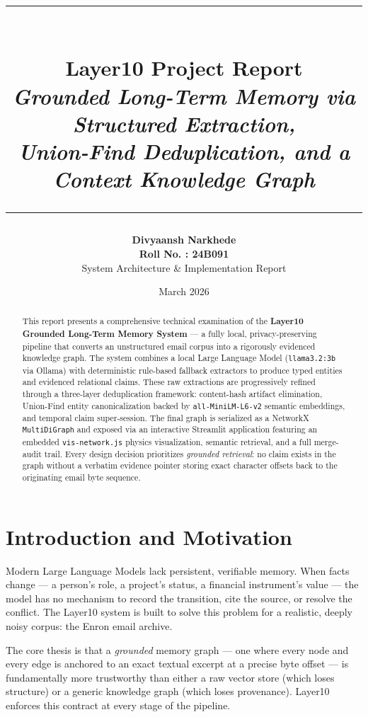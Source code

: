 \documentclass[12pt,a4paper]{article}
\title{
    \vspace{-2cm}
    \rule{\linewidth}{0.8mm} \\[0.5cm]
    {\Huge \textbf{Layer10 Project Report}} \\[0.3cm]
    {\large \textit{Grounded Long-Term Memory via Structured Extraction,\\
    Union-Find Deduplication, and a Context Knowledge Graph}} \\[0.3cm]
    \rule{\linewidth}{0.8mm}
}
\author{
    \textbf{Divyaansh Narkhede} \\
    \textbf{Roll No. : 24B091} \\
    System Architecture \& Implementation Report
}
\date{March 2026}
\begin{document}
\maketitle
\thispagestyle{empty}

\begin{abstract}
\noindent
This report presents a comprehensive technical examination of the \textbf{Layer10 Grounded Long-Term Memory System} — a fully local, privacy-preserving pipeline that converts an unstructured email corpus into a rigorously evidenced knowledge graph. The system combines a local Large Language Model (\texttt{llama3.2:3b} via Ollama) with deterministic rule-based fallback extractors to produce typed entities and evidenced relational claims. These raw extractions are progressively refined through a three-layer deduplication framework: content-hash artifact elimination, Union-Find entity canonicalization backed by \texttt{all-MiniLM-L6-v2} semantic embeddings, and temporal claim super-session. The final graph is serialized as a NetworkX \texttt{MultiDiGraph} and exposed via an interactive Streamlit application featuring an embedded \texttt{vis-network.js} physics visualization, semantic retrieval, and a full merge-audit trail. Every design decision prioritizes \textit{grounded retrieval}: no claim exists in the graph without a verbatim evidence pointer storing exact character offsets back to the originating email byte sequence.
\end{abstract}

\tableofcontents
\newpage

\section{Introduction and Motivation}

Modern Large Language Models lack persistent, verifiable memory. When facts change — a person's role, a project's status, a financial instrument's value — the model has no mechanism to record the transition, cite the source, or resolve the conflict. The Layer10 system is built to solve this problem for a realistic, deeply noisy corpus: the Enron email archive.

The core thesis is that a \textit{grounded} memory graph — one where every node and every edge is anchored to an exact textual excerpt at a precise byte offset — is fundamentally more trustworthy than either a raw vector store (which loses structure) or a generic knowledge graph (which loses provenance). Layer10 enforces this contract at every stage of the pipeline.
\end{document}
